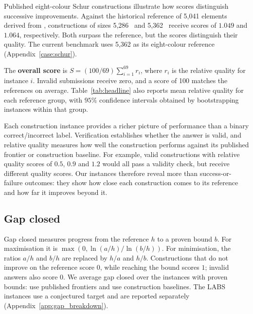 \documentclass{article}
\begin{document}
Published eight-colour Schur constructions illustrate how scores distinguish successive improvements. Against the historical reference of 5,041 elements derived from \citet{fredricksen2000schur}, constructions of sizes 5,286~\citep{rowley2021templates} and 5,362~\citep{bengone2026schur} receive scores of $1.049$ and $1.064$, respectively. Both surpass the reference, but the scores distinguish their quality. The current benchmark uses 5,362 as its eight-colour reference (Appendix~\ref{case:schur}).

The \textbf{overall score} is $S=(100/69)\sum_{i=1}^{69}r_i$, where $r_i$ is the relative quality for instance $i$. Invalid submissions receive zero, and a score of 100 matches the references on average. Table~\ref{tab:headline} also reports mean relative quality for each reference group, with $95\%$ confidence intervals obtained by bootstrapping instances within that group.

Each construction instance provides a richer picture of performance than a binary correct/incorrect label. Verification establishes whether the answer is valid, and relative quality measures how well the construction performs against its published frontier or construction baseline. For example, valid constructions with relative quality scores of $0.5$, $0.9$ and $1.2$ would all pass a validity check, but receive different quality scores. Our \DistinctN{} instances therefore reveal more than \DistinctN{} success-or-failure outcomes: they show how close each construction comes to its reference and how far it improves beyond it.

\subsection{Gap closed}
\label{sec:headroom}
Gap closed measures progress from the reference $h$ to a proven bound $b$. For maximisation it is $\max(0,\ln(a/h)/\ln(b/h))$. For minimisation, the ratios $a/h$ and $b/h$ are replaced by $h/a$ and $h/b$. Constructions that do not improve on the reference score $0$, while reaching the bound scores $1$; invalid answers also score $0$. We average gap closed over the \GapN{} instances with proven bounds: \GapPublishedN{} use published frontiers and \GapConstructionN{} use construction baselines. The \TargetN{} LABS instances use a conjectured target and are reported separately (Appendix~\ref{app:gap_breakdown}).
\end{document}
